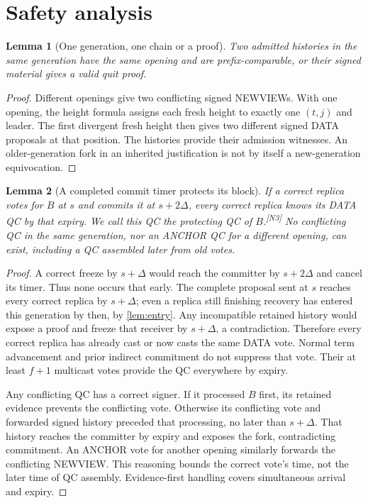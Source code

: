 \documentclass[11pt,a4paper]{article}
\newcommand{\NEW}[1]{{\color{diffNew}#1}}
\newcommand{\CH}[1]{\textsuperscript{\color{diffNew}\sffamily\scriptsize[#1]}}
\newcommand{\NEW}[1]{#1}
\newcommand{\CH}[1]{}
\newtheorem{lemma}[lemma]{Lemma}
\begin{document}
\section{Safety analysis}
\label{sec:safety}
\begin{lemma}[One generation, one chain or a proof]
\label{lem:fork}
Two admitted histories in the same generation have the same opening and
are prefix-comparable, or their signed material gives a valid quit proof.
\end{lemma}
\begin{proof}
Different openings give two conflicting signed NEWVIEWs. With one opening,
the height formula assigns each fresh height to exactly one $(t,j)$ and
leader. The first divergent fresh height then gives two different signed
DATA proposals at that position. The histories provide their admission
witnesses. An older-generation fork in an inherited justification is not
by itself a new-generation equivocation.
\end{proof}

\begin{lemma}[A completed \NEW{commit} timer protects its block]
\label{lem:timer}
If a correct replica votes for $B$ at $s$ and commits it at $s+2\Delta$,
every correct replica knows its DATA QC by that expiry. \NEW{We call this
QC the \emph{protecting QC} of $B$.}\CH{N3} No conflicting
QC in the same generation, nor an ANCHOR QC for a different opening,
can exist, including a QC assembled later from old votes.
\end{lemma}
\begin{proof}
A correct freeze by $s+\Delta$ would reach the committer by $s+2\Delta$
and cancel its timer. Thus none occurs that early. The complete proposal
sent at $s$ reaches every correct replica by $s+\Delta$; even a replica
still finishing recovery has entered this generation by then, by
\cref{lem:entry}. Any incompatible retained history would expose a proof
and freeze that receiver by $s+\Delta$, a contradiction. Therefore every
correct replica has already cast or now casts the same DATA vote. Normal
term advancement and prior indirect commitment do not suppress that vote.
Their at least $f+1$ multicast votes provide the QC everywhere by expiry.

Any conflicting QC has a correct signer. If it processed $B$ first, its
retained evidence prevents the conflicting vote. Otherwise its conflicting
vote and forwarded signed history preceded that processing, no later
than $s+\Delta$. That history reaches the committer by expiry and exposes
the fork, contradicting commitment. An ANCHOR vote for another opening
similarly forwards the conflicting NEWVIEW. This reasoning bounds the
correct vote's time, not the later time of QC assembly. Evidence-first
handling covers simultaneous arrival and expiry.
\end{proof}
\end{document}
